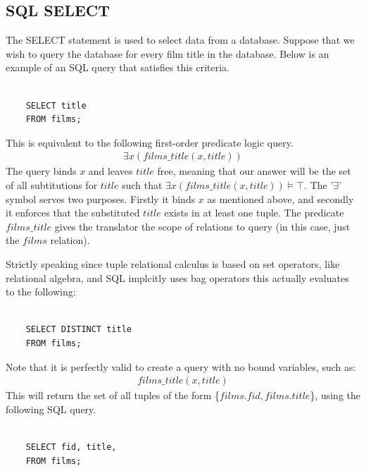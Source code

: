 \documentclass[a4paper, 11pt]{article}
\begin{document}
    \subsection{SQL SELECT}

    The SELECT statement is used to select data from a database.\cite{w3SELECT}
    Suppose that we wish to query the database for every film title in the
    database. Below is an example of an SQL query that satisfies this criteria.

    \begin{verbatim}

    SELECT title
    FROM films;

    \end{verbatim}

    This is equivalent to the following first-order predicate logic query.
    \begin{gather}
      \exists x(films\_title(x, title)) \label{select1}
    \end{gather}
    The query binds $x$ and leaves $title$ free, meaning that our
    answer will be the set of all subtitutions for $title$ such that
    $\exists x(films\_title(x, title)) \models \top$. The '$\exists$' symbol
    serves two purposes. Firstly it binds $x$ as mentioned above, and secondly
    it enforces that the substituted $title$ exists in at least one tuple.
    The predicate $films\_title$ gives the translator the scope of
    relations to query (in this case, just the $films$ relation).

    Strictly speaking since tuple relational calculus is based on set
    operators, like relational algebra, and SQL implcitly uses bag operators
    this actually evaluates to the following:

    \begin{verbatim}

    SELECT DISTINCT title
    FROM films;

    \end{verbatim}

    Note that it is perfectly valid to create a query with no bound variables,
    such as:
    \begin{gather}
      films\_title(x, title) \label{select2}
    \end{gather}
    This will return the set of all tuples of the form \{$films.fid,
    films.title$\}, using the following SQL query.

    \begin{verbatim}

    SELECT fid, title,
    FROM films;

    \end{verbatim}
\end{document}
